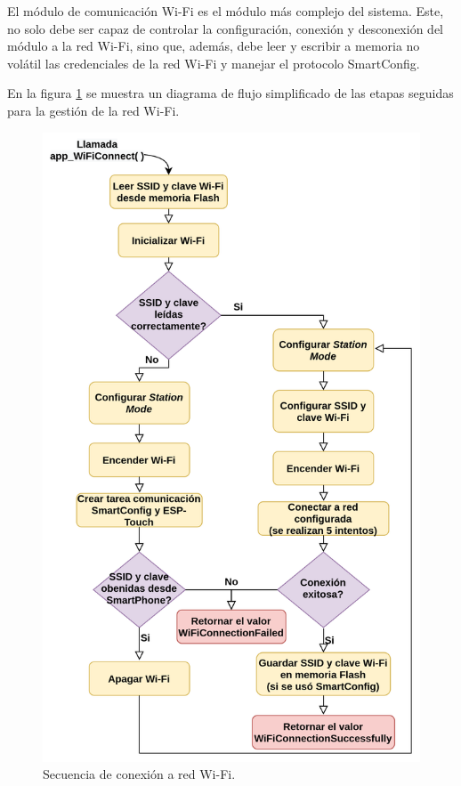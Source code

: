 El módulo de comunicación Wi-Fi es el módulo más complejo del sistema. Este, no solo debe ser capaz de controlar la configuración, conexión y desconexión del módulo a la red Wi-Fi, sino que, además, debe leer y escribir a memoria no volátil las credenciales de la red Wi-Fi y manejar el protocolo SmartConfig. 

En la figura \ref{fig:WiFi} se muestra un diagrama de flujo simplificado de las etapas seguidas para la gestión de la red Wi-Fi. 

\pagebreak

\begin{figure}[ht]
	\centering
	\includegraphics[scale=0.95]{./Figures/WiFi.png}
	\caption{Secuencia de conexión a red Wi-Fi.}
	\label{fig:WiFi}
\end{figure}

